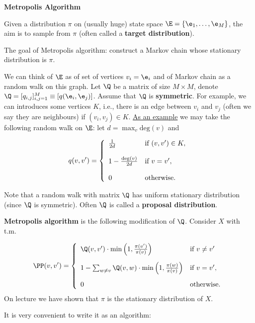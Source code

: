 \documentclass[a4paper,12pt]{article}
\begin{document}
 
\noindent
 {
\setlength\fboxsep{4pt}%
 \setlength\fboxrule{2pt}%
 }
\bigskip\bigskip
  \begin{center}
   \textbf{Metropolis Algorithm}
  \end{center}
  
\par \bigskip
Given a distribution $\pi$ on (usually huge) state space $\E=\{\e_1,\ldots,\e_M\}$, the aim is to sample from $\pi$ (often called a \textbf{target distribution}). 


The goal of Metropolis algorithm: construct a Markov chain whose stationary distribution is $\pi$.

We can think of $\E$ as of set of vertices $v_i=\e_i$ and of Markov chain as a random walk on this graph. 
Let $\Q$ be a matrix of size $M\times M$, denote $\Q=[q_{i,j}]_{i,j=1}^M\equiv [q(\e_i,\e_j)]$.
Assume that $\Q$ is \textbf{symmetric}. For example, we can introduces some vertices $K$, i.e.,
there is an edge between $v_i$ and $v_j$ (often we say they are neighbours) if  $(v_i,v_j)\in K$.
\underline{As an example} we may take the following random walk on $\E$: let $d=\max_{v} \textrm{deg}(v)$ and 

$$q(v,v')=\left\{
\begin{array}{llllcccccccc}
{1\over 2d} & \textrm{if }   (v,v')\in K,\\[12pt]
1-{\textrm{deg}(v)\over 2d}  & \textrm{if }   v=v',\\[12pt]
0 & \textrm{otherwise}.
    \end{array}\right.$$

Note that a random walk with matrix $\Q$ has uniform stationary distribution (since $\Q$ is symmetric).
Often $\Q$ is called a \textbf{proposal distribution}.
\medskip\par 
\textbf{Metropolis algorithm} is the following modification of $\Q$. Consider $X$ with t.m.

$$\PP(v,v')=\left\{
\begin{array}{llccccc}
\Q(v,v')\cdot\min\left(1,{\pi(v')\over \pi(v)}\right) & \textrm{if }  v\neq v'\\[12pt]
1-\sum_{w\neq v} \Q(v,w)\cdot\min\left(1,{\pi(w)\over \pi(v)}\right)   & \textrm{if }   v=v',\\[12pt]
0 & \textrm{otherwise}.
    \end{array}\right.$$
On lecture we have shown that $\pi$ is the stationary distribution of $X$.
\medskip\par 
It is very convenient to write it as an algorithm:
     
\end{document}
